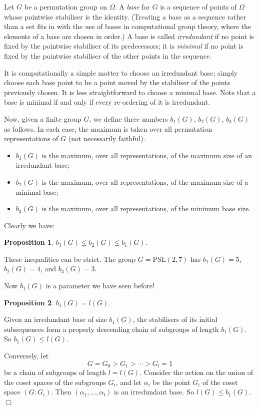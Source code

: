 \documentclass[12pt]{article}
\newtheorem{prop}{Proposition}[section]
\newenvironment{pf}{\prepf\rm}{\endprepf}
\newcommand{\qed}{\hfill$\Box$}
\begin{document}
Let $G$ be a permutation group on $\Omega$. A \emph{base} for $G$ is a
sequence of points of $\Omega$ whose pointwise stabiliser is the identity.
(Treating a base as a sequence rather than a set fits in with the use of
bases in computational group theory, where the elements of a base are chosen
in order.) A base is called \emph{irredundant} if no point is fixed by the
pointwise stabiliser of its predecessors; it is \emph{minimal} if no point
is fixed by the pointwise stabiliser of the other points in the sequence.

It is computationally a simple matter to choose an irredundant base; simply
choose each base point to be a point moved by the stabiliser of the points
previously chosen. It is less straightforward to choose a minimal base.
Note that a base is minimal if and only if every re-ordering of it is
irredundant.

Now, given a finite group $G$, we define three numbers $b_1(G)$, $b_2(G)$,
$b_3(G)$ as follows. In each case, the maximum is taken over all permutation
representations of $G$ (not necessarily faithful).
\begin{itemize}
\item $b_1(G)$ is the maximum, over all representations, of the maximum size
of an irredundant base;
\item $b_2(G)$ is the maximum, over all representations, of the maximum size
of a minimal base;
\item $b_3(G)$ is the maximum, over all representations, of the minimum
base size.
\end{itemize}
Clearly we have:

\begin{prop}
$b_3(G)\le b_2(G)\le b_1(G)$.
\end{prop}

These inequalities can be strict. The group $G=\mathrm{PSL}(2,7)$ has
$b_1(G)=5$, $b_2(G)=4$, and $b_3(G)=3$.

Now $b_1(G)$ is a parameter we have seen before!

\begin{prop}
$b_1(G)=l(G)$.
\end{prop}

\begin{pf}
Given an irredundant base of size $b_1(G)$, the stabilisers of its initial
subsequences form a properly descending chain of subgroups of length 
$b_1(G)$. So $b_1(G)\le l(G)$.

Conversely, let
\[G=G_0>G_1>\cdots>G_l=1\]
be a chain of subgroups of length $l=l(G)$. Consider the action on the union
of the coset spaces of the subgroups $G_i$, and let $\alpha_i$ be the point
$G_i$ of the coset space $(G:G_i)$. Then $(\alpha_1,\ldots,\alpha_l)$ is
an irredundant base. So $l(G)\le b_1(G)$.\qed
\end{pf}
\end{document}
